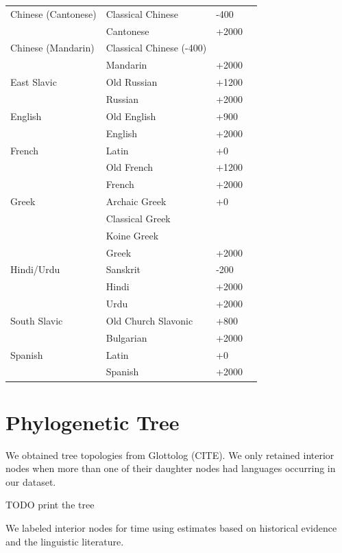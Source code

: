 \documentclass[11pt,a4paper]{article}
\begin{document}
\begin{tabular}{llll} \hline
Chinese (Cantonese) & Classical Chinese & -400  \\
& Cantonese & +2000\\ \hline
Chinese (Mandarin) & Classical Chinese (-400)  \\
& Mandarin & +2000 \\ \hline
East Slavic & Old Russian & +1200 \\
& Russian & +2000 \\ \hline
English & Old English & +900 \\
& English  & +2000\\ \hline
French & Latin &+0  \\
& Old French &+1200\\
& French  & +2000\\ \hline
Greek & Archaic Greek & +0 \\
      & Classical Greek \\
      & Koine Greek \\
& Greek  & +2000\\ \hline
Hindi/Urdu & Sanskrit & -200 \\
& Hindi  & +2000\\
& Urdu  & +2000\\ \hline
South Slavic & Old Church Slavonic & +800 \\
& Bulgarian  & +2000\\ \hline
Spanish & Latin &+0 \\
& Spanish  & +2000\\ \hline
\end{tabular}

\section{Phylogenetic Tree}

We obtained tree topologies from Glottolog (CITE).
We only retained interior nodes when more than one of their daughter nodes had languages occurring in our dataset.

TODO print the tree

We labeled interior nodes for time using estimates based on historical evidence and the linguistic literature.
\end{document}

